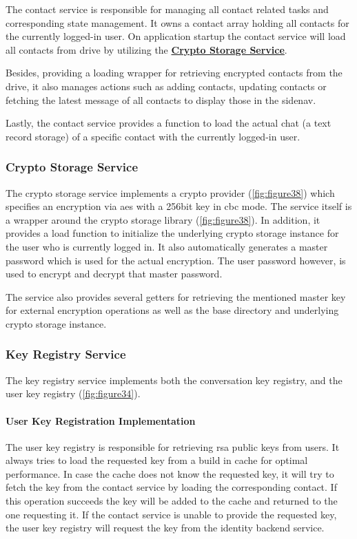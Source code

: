The contact service is responsible for managing all contact related tasks and corresponding state management.
It owns a contact array holding all contacts for the currently logged-in user.
On application startup the contact service will load all contacts from drive by utilizing the
\textbf{\hyperref[subsubsec:crypto-storage-service]{Crypto Storage Service}}.

Besides, providing a loading wrapper for retrieving encrypted contacts from the drive, it also manages actions such as
adding contacts, updating contacts or fetching the latest message of all contacts to display those in the sidenav.

Lastly, the contact service provides a function to load the actual chat (a text record storage) of a specific contact
with the currently logged-in user.

\subsubsection{Crypto Storage Service}

The crypto storage service implements a crypto provider (\ref{fig:figure38}) which specifies an encryption via \ac{aes}
with a 256bit key in cbc mode.
The service itself is a wrapper around the crypto storage library (\ref{fig:figure38}).
In addition, it provides a load function to initialize the underlying crypto storage instance for the user who is
currently logged in.
It also automatically generates a master password which is used for the actual encryption.
The user password however, is used to encrypt and decrypt that master password.

The service also provides several getters for retrieving the mentioned master key for external encryption operations as
well as the base directory and underlying crypto storage instance.

\subsubsection{Key Registry Service}

The key registry service implements both the conversation key registry, and the user key registry (\ref{fig:figure34}).

\paragraph{User Key Registration Implementation}
The user key registry is responsible for retrieving \ac{rsa} public keys from users.
It always tries to load the requested key from a build in cache for optimal performance.
In case the cache does not know the requested key, it will try to fetch the key from the contact service by loading
the corresponding contact.
If this operation succeeds the key will be added to the cache and returned to the one requesting it.
If the contact service is unable to provide the requested key, the user key registry will request the key from the
identity backend service.

